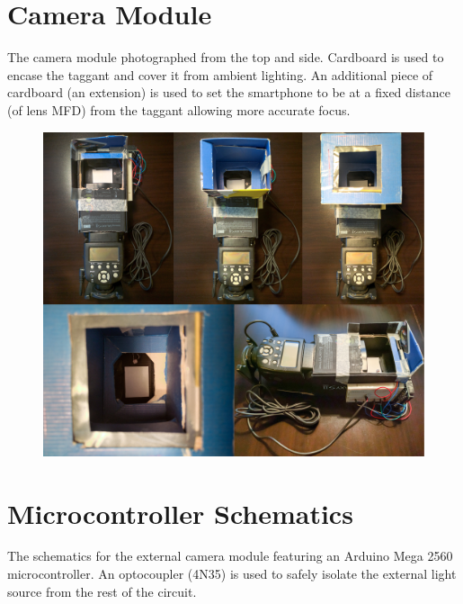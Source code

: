 \documentclass[thesis.tex]{subfiles}
\begin{document}
\chapter{Camera Module}
\label{appendix:camera-module}

The camera module photographed from the top and side. Cardboard is used to encase the taggant and cover it from ambient lighting. An additional piece of cardboard (an extension) is used to set the smartphone to be at a fixed distance (of lens MFD) from the taggant allowing more accurate focus.

\begin{figure}[h]
\centering \includegraphics[width=\textwidth,height=\textheight,keepaspectratio=true]{images/design_implementation/camera_module-actual.jpg}
\end{figure}




\chapter{Microcontroller Schematics}
\label{appendix:camera-module-schematics}

The schematics for the external camera module featuring an Arduino Mega 2560 microcontroller. An optocoupler (4N35) is used to safely isolate the external light source from the rest of the circuit.
\end{document}
